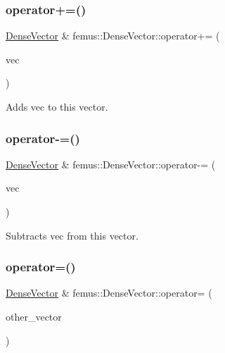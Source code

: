 \subsubsection{\texorpdfstring{operator+=()}{operator+=()}}
{\footnotesize\ttfamily \mbox{\hyperlink{classfemus_1_1_dense_vector}{Dense\+Vector}} \& femus\+::\+Dense\+Vector\+::operator+= (\begin{DoxyParamCaption}\item[{const \mbox{\hyperlink{classfemus_1_1_dense_vector}{Dense\+Vector}} \&}]{vec }\end{DoxyParamCaption})\hspace{0.3cm}{\ttfamily [inline]}}



Adds {\ttfamily vec} to this vector. 

\mbox{\label{classfemus_1_1_dense_vector_a1f66784d89711fd43a7a3193d23b177a}} 
\subsubsection{\texorpdfstring{operator-\/=()}{operator-=()}}
{\footnotesize\ttfamily \mbox{\hyperlink{classfemus_1_1_dense_vector}{Dense\+Vector}} \& femus\+::\+Dense\+Vector\+::operator-\/= (\begin{DoxyParamCaption}\item[{const \mbox{\hyperlink{classfemus_1_1_dense_vector}{Dense\+Vector}} \&}]{vec }\end{DoxyParamCaption})\hspace{0.3cm}{\ttfamily [inline]}}



Subtracts {\ttfamily vec} from this vector. 

\mbox{\label{classfemus_1_1_dense_vector_a6fb17b0b5c1af6bb8be9075254e61866}} 
\subsubsection{\texorpdfstring{operator=()}{operator=()}}
{\footnotesize\ttfamily \mbox{\hyperlink{classfemus_1_1_dense_vector}{Dense\+Vector}} \& femus\+::\+Dense\+Vector\+::operator= (\begin{DoxyParamCaption}\item[{const \mbox{\hyperlink{classfemus_1_1_dense_vector}{Dense\+Vector}} \&}]{other\+\_\+vector }\end{DoxyParamCaption})\hspace{0.3cm}{\ttfamily [inline]}}


